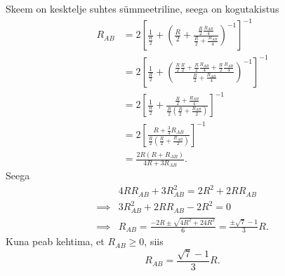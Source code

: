 Skeem on kesktelje suhtes sümmeetriline, seega on kogutakistus
\begin{align}
  R_{AB}&=2\left[\frac{1}{\frac{R}{2}}+\left(\frac{R}{2} + \frac{\frac{R}{2}\frac{R_{AB}}{4}}{\frac{R}{2}+\frac{R_{AB}}{4}}\right)^{-1}\right]^{-1}\\
        &= 2 \left[ \frac{1}{\frac{R}{2}} + \left( \frac{\frac{R}{2} \frac{R}{2} + \frac{R}{2} \frac{R_{AB}}{4} + \frac{R}{2}\frac{R_{AB}}{4}}{\frac{R}{2}+\frac{R_{AB}}{4}} \right)^{-1} \right]^{-1}\\
        &= 2 \left[ \frac{1}{\frac{R}{2}} +  \frac{\frac{R}{2}+\frac{R_{AB}}{4}}{\frac{R}{2}\left(\frac{R}{2}+ \frac{R_{AB}}{2}\right)}  \right]^{-1}\\
        &= 2 \left[ \frac{R+\frac{3}{4}R_{AB}}{\frac{R}{2}\left(\frac{R}{2}+ \frac{R_{AB}}{2}\right)}  \right]^{-1}\\
        &= \frac{2R(R + R_{AB})}{4R+3R_{AB}}.
\end{align}
Seega
\begin{align}
&4R R_{AB} +3 R_{AB}^2=2R^2+2R R_{AB}\\
  \implies& 3R_{AB}^2 +2 R R_{AB} - 2R^2=0 \\
  \implies& R_{AB}=\frac{-2R \pm \sqrt{4R^2+24R^2}}{6}=\frac{\pm\sqrt{7}-1}{3}R.
\end{align}
Kuna peab kehtima, et $R_{AB} \geq 0$, siis
\begin{equation}
R_{AB}= \frac{\sqrt{7}-1}{3} R.
\end{equation}
\probend